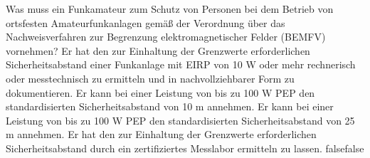     {Was muss ein Funkamateur zum Schutz von Personen bei dem Betrieb von ortsfesten Amateurfunkanlagen gemäß der Verordnung über das Nachweisverfahren zur Begrenzung elektromagnetischer Felder (BEMFV) vornehmen?}
    {Er hat den zur Einhaltung der Grenzwerte erforderlichen Sicherheitsabstand einer Funkanlage mit EIRP von 10 W oder mehr rechnerisch oder messtechnisch zu ermitteln und in nachvollziehbarer Form zu dokumentieren.}
    {Er kann bei einer Leistung von bis zu 100 W PEP den standardisierten Sicherheitsabstand von 10 m annehmen.}
    {Er kann bei einer Leistung von bis zu 100 W PEP den standardisierten Sicherheitsabstand von 25 m annehmen.}
    {Er hat den zur Einhaltung der Grenzwerte erforderlichen Sicherheitsabstand durch ein zertifiziertes Messlabor ermitteln zu lassen.}
    {false}{false}